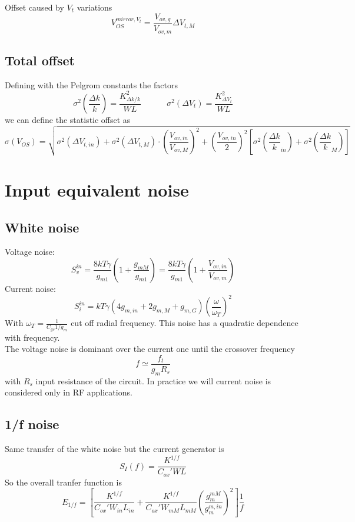 Offset caused by $V_t$ variations 
\begin{equation}
V_{OS}^{mirror,V_t}=\frac{V_{ov,g}}{V_{ov,m}}\Delta V_{t,M}
\end{equation}

\subsection{Total offset}
Defining with the Pelgrom constants the factors
\begin{equation}
\sigma^2(\frac{\Delta k}{k})=\frac{K^2_{\Delta k/k}}{WL}\ \ \ \ \ \ \ \ \ \ \ \ \ \ \sigma^2(\Delta V_t)=\frac{K^2_{\Delta V_t}}{WL}
\end{equation}
we can define the statistic offset as 
\begin{equation}
\sigma(V_{OS})=\sqrt{\sigma^2(\Delta V_{t,in}) +\sigma^2(\Delta V_{t,M})\cdot \left(\frac{V_{ov,in}}{V_{ov,M}}\right)^2+\left(\frac{V_{ov,in}}{2}\right)^2[\sigma^2(\frac{\Delta k}{k}_{in})+\sigma^2(\frac{\Delta k}{k}_M)]}
\end{equation}


\section{Input equivalent noise}

\subsection{White noise}
Voltage noise: 
\begin{equation}
S_v^{in}=\frac{8kT\gamma}{g_{m1}}(1+\frac{g_{mM}}{g_{m1}})=\frac{8kT\gamma}{g_{m1}}(1+\frac{V_{ov,in}}{V_{ov,m}})
\end{equation}
Current noise:
\begin{equation}
S_i^{in}=kT\gamma(4g_{m,in}+2g_{m,M}+g_{m,G})(\frac{\omega}{\omega_T})^2
\end{equation}
With $\omega_T=\frac{1}{C_{gs}1/g_m}$ cut off radial frequency. This noise has a quadratic dependence with frequency.\\
The voltage noise is dominant over the current one until the crossover frequency
\begin{equation}
f\simeq \frac{f_t}{g_mR_s}
\end{equation}
with $R_s$ input resistance of the circuit. In practice we will current noise is considered only in RF applications.

\subsection{1/f noise}
Same transfer of the white noise but the current generator is 
\begin{equation}
S_I(f)=\frac{K^{1/f}}{C_{ox}'WL}
\end{equation}
So the overall tranfer function is 
\begin{equation}
E_{1/f}=[\frac{K^{1/f}}{C_{ox}'W_{in}L_{in}}+\frac{K^{1/f}}{C_{ox}'W_{mM}L_{mM}}\left(\frac{g_{m}^{mM}}{g_{m}^{m,in}}\right)^2]\frac{1}{f}
\end{equation}


